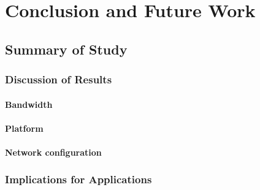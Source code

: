 \chapter{Conclusion and Future Work}

\label{Conclusion}
\label{Future Work}
\label{Chapter6}


\section{Summary of Study}                
\subsection{Discussion of Results}
\subsubsection{Bandwidth}
\subsubsection{Platform}
\subsubsection{Network configuration}
\subsection{Implications for Applications}
